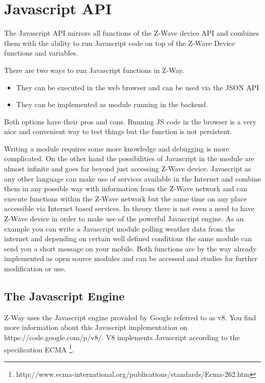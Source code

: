 \chapter{Javascript API}
\label{jsapi}

The Javascript API mirrors all functions of the Z-Wave device API and 
combines them with the ability to run Javascript code on top of the 
Z-Wave Device functions and variables.

There are two ways to run Javascript functions in Z-Way.
\begin{itemize}
\item They can be executed in the web browser and can be used via the JSON API
\item They can be implemented as module running in the backend.
\end{itemize}
Both options have their pros and cons. Running JS code in the browser is a very nice
and convenient way to test things but the function is not persistent.

Writing a module requires some more knowledge and debugging is more complicated. 
On the other hand the possibilities of Javascript in the module are almost infinite 
and goes far beyond just accessing Z-Wave device. Javascript as any other language
can make use of services available in the Internet and combine them in any possible 
way with information from the Z-Wave network and can execute functions within 
the Z-Wave network but the same time on any place accessible via Internet based 
services. In theory there is not even a need to have Z-Wave device in order to make 
use of the powerful Javascript engine. As an example you can write a Javascript 
module polling weather data from the internet and depending on certain well defined 
conditions the same module can send you a short message on your mobile.
Both functions are by the way already implemented as open source modules and can be 
accessed and studies for further modification or use.

\section {The Javascript Engine}

Z-Way uses the Javascript engine provided by Google referred to as v8. You find more 
information about this Javascript implementation on https://code.google.com/p/v8/.
V8 implements Javascript according to the specification ECMA 
\footnote {http://www.ecma-international.org/publications/standards/Ecma-262.htm}.

